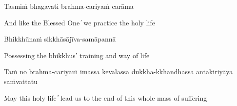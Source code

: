 Tasmiṁ bhagavati brahma-cariyaṁ carāma

\begin{cprenglish}
  And like the Blessed One  ̓  we practice the holy life
\end{cprenglish}

Bhikkhūnaṁ sikkhāsājīva-samāpannā

\begin{cprenglish}
  Possessing the bhikkhus’ training and way of life
\end{cprenglish}

Taṁ no brahma-cariyaṁ imassa kevalassa dukkha-kkhandhassa antakiriyāya saṁvattatu

\begin{cprenglish}
  May this holy life  ̓  lead us to the end of this whole mass of suffering
\end{cprenglish}
